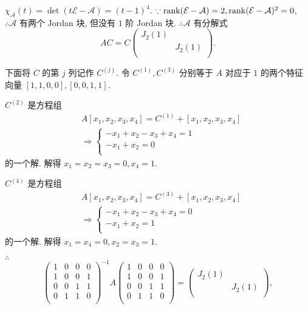 \documentclass[color=black,device=normal,lang=cn,mode=geye]{elegantnote}
\begin{document}
\begin{solution}
    $\chi_\mathcal{A}(t)=\det(t\mathcal{E}-\mathcal{A})=(t-1)^4$. $\because\operatorname{rank}(\mathcal{E}-\mathcal{A})=2,\operatorname{rank}(\mathcal{E}-\mathcal{A})^2=0$, $\therefore\mathcal{A}$ 有两个 Jordan 块, 但没有 $1$ 阶 Jordan 块. $\therefore\mathcal{A}$ 有分解式
    \[AC=C\begin{pmatrix}
        J_2(1) \\
        & J_2(1) \\
    \end{pmatrix}.\]

    下面将 $C$ 的第 $j$ 列记作 $C^{(j)}$. 令 $C^{(1)},C^{(3)}$ 分别等于 $A$ 对应于 $1$ 的两个特征向量 $[1,1,0,0],[0,0,1,1]$.

    $C^{(2)}$ 是方程组
    \begin{align*}
        & A[x_1,x_2,x_3,x_4]=C^{(1)}+[x_1,x_2,x_3,x_4] \\
        & \Rightarrow\begin{cases}
            -x_1+x_2-x_3+x_4=1 \\
            -x_1+x_2=0 \\
        \end{cases}
    \end{align*}
    的一个解. 解得 $x_1=x_2=x_3=0,x_4=1$.
    
    $C^{(4)}$ 是方程组
    \begin{align*}
        & A[x_1,x_2,x_3,x_4]=C^{(3)}+[x_1,x_2,x_3,x_4] \\
        & \Rightarrow\begin{cases}
            -x_1+x_2-x_3+x_4=0 \\
            -x_1+x_2=1 \\
        \end{cases}
    \end{align*}
    的一个解. 解得 $x_1=x_4=0,x_2=x_3=1$.

    $\therefore$
    \[\begin{pmatrix}
        1 & 0 & 0 & 0 \\
        1 & 0 & 0 & 1 \\
        0 & 0 & 1 & 1 \\
        0 & 1 & 1 & 0 \\
    \end{pmatrix}^{-1}A\begin{pmatrix}
        1 & 0 & 0 & 0 \\
        1 & 0 & 0 & 1 \\
        0 & 0 & 1 & 1 \\
        0 & 1 & 1 & 0 \\
    \end{pmatrix}=\begin{pmatrix}
        J_2(1) \\
        & J_2(1) \\
    \end{pmatrix},\]


\end{solution}
\end{document}
